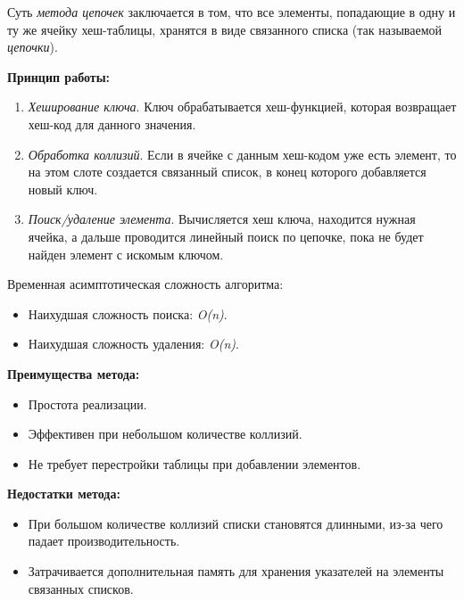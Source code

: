 Суть \textit{метода цепочек} заключается в том, что все элементы, попадающие в одну и ту же ячейку хеш-таблицы, хранятся в виде связанного списка (так называемой \textit{цепочки}).

\textbf{Принцип работы:}
\begin{enumerate}[font=\scriptsize, noitemsep, topsep=0pt, , partopsep=0pt]
	\item {\footnotesize \textit{Хеширование ключа}. Ключ обрабатывается хеш-функцией, которая возвращает хеш-код для данного значения.}
	\item {\footnotesize \textit{Обработка коллизий}. Если в ячейке с данным хеш-кодом уже есть элемент, то на этом слоте создается связанный список, в конец которого добавляется новый ключ.}
	\item {\footnotesize \textit{Поиск/удаление элемента}. Вычисляется хеш ключа, находится нужная ячейка, а дальше проводится линейный поиск по цепочке, пока не будет найден элемент с искомым ключом.}
\end{enumerate}
\vspace{5pt}

Временная асимптотическая сложность алгоритма: 
\begin{itemize}[font=\scriptsize, noitemsep, topsep=0pt, , partopsep=0pt]
	\item {\footnotesize Наихудшая сложность поиска: \textit{O(n)}.}
	\item {\footnotesize Наихудшая сложность удаления: \textit{O(n)}.}
\end{itemize}
\vspace{5pt}

\begin{minipage}[t]{0.45\textwidth}
	\textbf{Преимущества метода:}
	\begin{itemize}[leftmargin=*, font=\scriptsize, noitemsep, topsep=0pt, , partopsep=0pt]
		\item {\footnotesize Простота реализации.}
		\item {\footnotesize Эффективен при небольшом количестве коллизий.}
		\item {\footnotesize Не требует перестройки таблицы при добавлении элементов.}
	\end{itemize}
\end{minipage}
\hspace{1cm}
\begin{minipage}[t]{0.45\textwidth}
	\textbf{Недостатки метода:}
	\begin{itemize}[leftmargin=*, font=\scriptsize, noitemsep, topsep=0pt, , partopsep=0pt]
		\item {\footnotesize При большом количестве коллизий списки становятся длинными, из-за чего падает производительность.}
		\item {\footnotesize Затрачивается дополнительная память для хранения указателей на элементы связанных списков.}
	\end{itemize}
\end{minipage}

